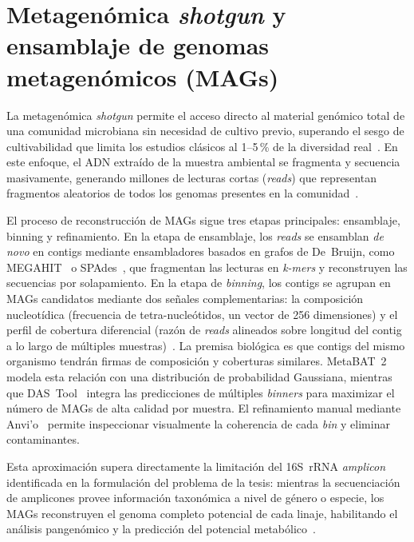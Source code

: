 \section{Metagenómica \textit{shotgun} y ensamblaje de genomas
  metagenómicos (MAGs)}
\label{sec:metagenomics}

La metagenómica \textit{shotgun} permite el acceso directo al material
genómico total de una comunidad microbiana sin necesidad de cultivo
previo, superando el sesgo de cultivabilidad que limita los estudios
clásicos al 1--5\,\% de la diversidad real~\cite{skipper2022,li2018deterioration, PitaGaleana2025}. En este enfoque, el ADN extraído de la muestra
ambiental se fragmenta y secuencia masivamente, generando millones de
lecturas cortas (\textit{reads}) que representan fragmentos aleatorios
de todos los genomas presentes en la comunidad~\cite{branysova2022,PitaGaleana2025}.

El proceso de reconstrucción de MAGs sigue tres etapas principales:
ensamblaje, binning y refinamiento. En la
etapa de ensamblaje, los \textit{reads} se ensamblan \textit{de novo} en
contigs mediante ensambladores basados en grafos de De~Bruijn, como
MEGAHIT~\cite{megahit2015} o SPAdes~\cite{metaspades2017}, que
fragmentan las lecturas en \textit{k-mers} y reconstruyen las secuencias
por solapamiento. En la etapa de \textit{binning}, los contigs se
agrupan en MAGs candidatos mediante dos señales complementarias: la
composición nucleotídica (frecuencia de tetra-nucleótidos, un
vector de 256 dimensiones) y el perfil de cobertura
diferencial (razón de \textit{reads} alineados sobre longitud del
contig a lo largo de múltiples muestras)~\cite{bowers2017,PitaGaleana2025}. La premisa biológica es que
contigs del mismo organismo tendrán firmas de composición y coberturas
similares. MetaBAT~2~\cite{metabat2019} modela esta relación con una
distribución de probabilidad Gaussiana, mientras que DAS~Tool~\cite{Sieber2018} integra
las predicciones de múltiples \textit{binners} para maximizar el
número de MAGs de alta calidad por muestra. El refinamiento manual
mediante Anvi'o~\cite{bowers2017, Eren2015} permite inspeccionar visualmente la coherencia de cada
\textit{bin} y eliminar contaminantes.

Esta aproximación supera directamente la limitación del 16S~rRNA
\textit{amplicon} identificada en la formulación del problema de la
tesis: mientras la secuenciación de amplicones provee información
taxonómica a nivel de género o especie, los MAGs reconstruyen el
genoma completo potencial de cada linaje, habilitando el
análisis pangenómico y la predicción del potencial
metabólico~\cite{PitaGaleana2025,dram2020,panaroo2020}.

